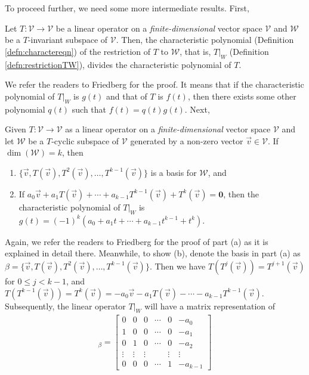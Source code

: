 To proceed further, we need some more intermediate results. First,
\begin{proper}
\label{proper:B12}
Let $T: \mathcal{V} \to \mathcal{V}$ be a linear operator on a \textit{finite-dimensional} vector space $\mathcal{V}$ and $\mathcal{W}$ be a $T$-invariant subspace of $\mathcal{V}$. Then, the characteristic polynomial (Definition \ref{defn:charactereqn}) of the restriction of $T$ to $\mathcal{W}$, that is, $T|_W$ (Definition \ref{defn:restrictionTW}), divides the characteristic polynomial of $T$.
\end{proper}
We refer the readers to Friedberg for the proof. It means that if the characteristic polynomial of $T|_W$ is $g(t)$ and that of $T$ is $f(t)$, then there exists some other polynomial $q(t)$ such that $f(t) = q(t)g(t)$. Next,
\begin{proper}
\label{proper:B13}
Given $T: \mathcal{V} \to \mathcal{V}$ as a linear operator on a \textit{finite-dimensional} vector space $\mathcal{V}$ and let $\mathcal{W}$ be a $T$-cyclic subspace of $\mathcal{V}$ generated by a non-zero vector $\vec{v} \in \mathcal{V}$. If $\dim(\mathcal{W}) = k$, then
\begin{enumerate}[label=(\alph*)]
    \item $\{\vec{v}, T(\vec{v}), T^2(\vec{v}), \ldots, T^{k-1}(\vec{v})\}$ is a basis for $\mathcal{W}$, and
    \item If $a_0 \vec{v} + a_1 T(\vec{v}) + \cdots + a_{k-1}T^{k-1}(\vec{v}) + T^k(\vec{v}) = \textbf{0}$, then the characteristic polynomial of $T|_W$ is $g(t) = (-1)^k (a_0 + a_1t + \cdots + a_{k-1}t^{k-1} + t^k)$.
\end{enumerate}
\end{proper}
Again, we refer the readers to Friedberg for the proof of part (a) as it is explained in detail there. Meanwhile, to show (b), denote the basis in part (a) as $\mathcal{\beta} = \{\vec{v}, T(\vec{v}), T^2(\vec{v}), \ldots, T^{k-1}(\vec{v})\}$. Then we have $T(T^j(\vec{v})) = T^{j+1}(\vec{v})$ for $0 \leq j < k-1$, and $T(T^{k-1}(\vec{v})) = T^k(\vec{v}) = -a_0 \vec{v} - a_1 T(\vec{v}) - \cdots - a_{k-1}T^{k-1}(\vec{v})$. Subsequently, the linear operator $T|_W$ will have a matrix representation of
\begin{align}
[T|_W]_\beta = 
\begin{bmatrix}
0 & 0 & 0 & \cdots & 0 & -a_0 \\
1 & 0 & 0 & \cdots & 0 & -a_1 \\
0 & 1 & 0 & \cdots & 0 & -a_2 \\
\vdots & \vdots & \vdots & & \vdots & \vdots \\
0 & 0 & 0 & \cdots & 1 & -a_{k-1}
\end{bmatrix}
\end{align}
